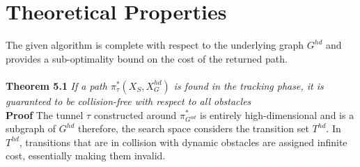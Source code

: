\section{Theoretical Properties}
\label{sec:ppad-theory}
The given algorithm is complete with respect to the underlying graph $G^{hd}$ and provides a sub-optimality bound on the cost of the returned path. \\ \\
\textbf{Theorem 5.1} \textit{If a path $\pi_\tau^*(X_S,X_G^{hd})$ is found in the tracking phase, it is guaranteed to be collision-free with respect to all obstacles} \\
\textbf{Proof} The tunnel $\tau$ constructed around $\pi_{G^{ad}}^*$ is entirely high-dimensional and is a subgraph of $G^{hd}$ therefore, the search space considers the transition set $T^{hd}$. In $T^{hd}$, transitions that are in collision with dynamic obstacles are assigned infinite cost, essentially making them invalid.


